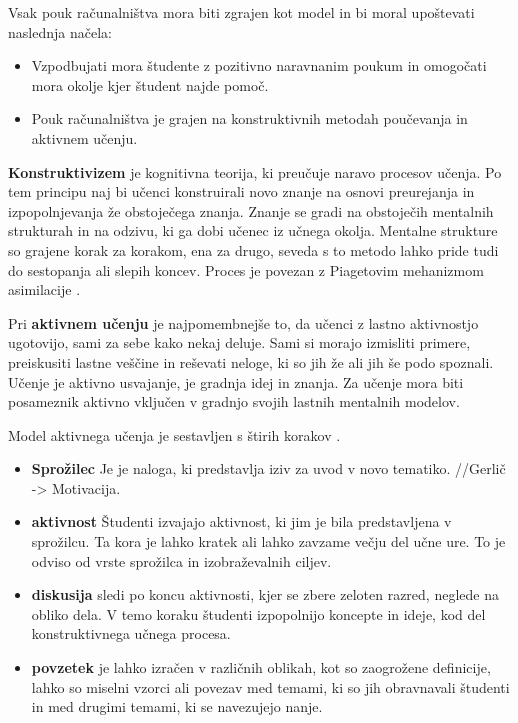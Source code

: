 Vsak pouk računalništva mora biti zgrajen kot model in bi moral
upoštevati naslednja načela:
\begin{itemize}
\tightlist
\item Vzpodbujati mora študente z pozitivno naravnanim poukum in
   omogočati mora okolje kjer študent najde pomoč.
 \item Pouk računalništva je grajen na konstruktivnih metodah poučevanja
   in aktivnem učenju.
\end{itemize}

\textbf{Konstruktivizem} je kognitivna teorija, ki preučuje naravo
procesov učenja. Po tem principu naj bi učenci konstruirali novo
znanje na osnovi preurejanja in izpopolnjevanja že obstoječega
znanja. Znanje se gradi na obstoječih mentalnih strukturah in na
odzivu, ki ga dobi učenec iz učnega okolja. Mentalne strukture so
grajene korak za korakom, ena za drugo, seveda s to metodo lahko pride
tudi do sestopanja ali slepih koncev. Proces je povezan z Piagetovim
mehanizmom asimilacije \cite{guideTCS}.

Pri \textbf{aktivnem učenju} je najpomembnejše to, da učenci z lastno
aktivnostjo ugotovijo, sami za sebe kako nekaj deluje. Sami si morajo
izmisliti primere, preiskusiti lastne veščine in reševati neloge, ki
so jih že ali jih še podo spoznali. Učenje je aktivno usvajanje, je
gradnja idej in znanja. Za učenje mora biti posameznik aktivno
vključen v gradnjo svojih lastnih mentalnih modelov.

Model aktivnega učenja je sestavljen s štirih korakov \cite{guideTCS}.

\begin{itemize}
\tightlist
\item \textbf{Sprožilec} Je je naloga, ki predstavlja  iziv za uvod v novo
tematiko.  //Gerlič -> Motivacija.
\item \textbf{aktivnost} Študenti izvajajo aktivnost, ki jim je bila
predstavljena v sprožilcu. Ta kora je lahko kratek ali lahko
zavzame večju del učne ure. To je odviso od vrste sprožilca in
izobraževalnih ciljev.
\item \textbf{diskusija} sledi po koncu aktivnosti, kjer se zbere zeloten
razred, neglede na obliko dela. V temo koraku študenti izpopolnijo
koncepte in ideje, kod del konstruktivnega učnega procesa.
\item \textbf{povzetek} je lahko izračen v različnih oblikah, kot so
zaogrožene definicije, lahko so miselni vzorci ali povezav med
temami, ki so jih obravnavali študenti in med drugimi temami, ki se
navezujejo nanje.
\end{itemize}

